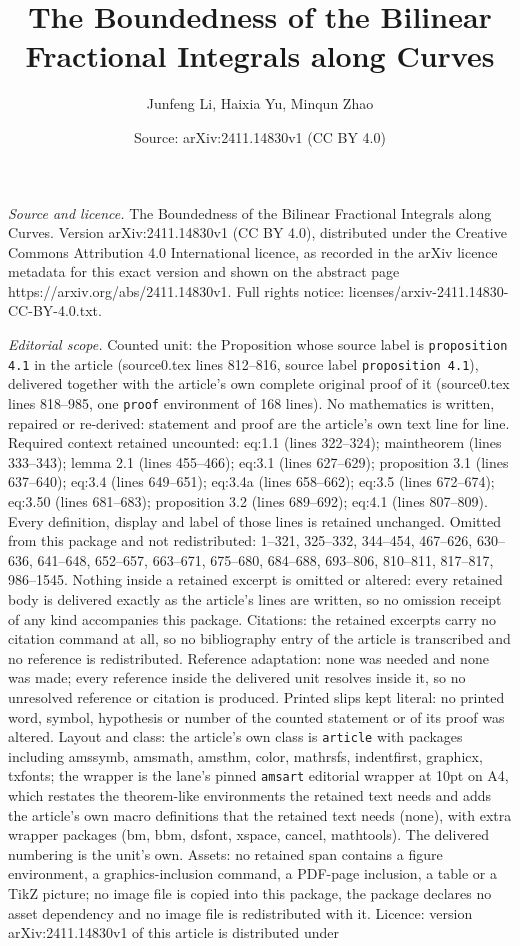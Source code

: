 \documentclass[10pt,a4paper]{amsart}
\title[The Boundedness of the Bilinear Fractional Integrals along C]{The Boundedness of the Bilinear Fractional Integrals along Curves}
\author{Junfeng Li, Haixia Yu, Minqun Zhao}
\date{Source: arXiv:2411.14830v1 (CC BY 4.0)}
\begin{document}
\maketitle

\noindent\emph{Source and licence.} The Boundedness of the Bilinear Fractional Integrals along Curves. Version arXiv:2411.14830v1 (CC BY 4.0), distributed under the Creative Commons Attribution 4.0 International licence, as recorded in the arXiv licence metadata for this exact version and shown on the abstract page https://arxiv.org/abs/2411.14830v1. Full rights notice: licenses/arxiv-2411.14830-CC-BY-4.0.txt.\par\smallskip

\noindent\textit{Editorial scope.} Counted unit: the Proposition whose source label is \texttt{proposition 4.1} in the article (source0.tex lines 812--816, source label \texttt{proposition 4.1}), delivered together with the article's own complete original proof of it (source0.tex lines 818--985, one \texttt{proof} environment of 168 lines). No mathematics is written, repaired or re-derived: statement and proof are the article's own text line for line. Required context retained uncounted: eq:1.1 (lines 322--324); maintheorem (lines 333--343); lemma 2.1 (lines 455--466); eq:3.1 (lines 627--629); proposition 3.1 (lines 637--640); eq:3.4 (lines 649--651); eq:3.4a (lines 658--662); eq:3.5 (lines 672--674); eq:3.50 (lines 681--683); proposition 3.2 (lines 689--692); eq:4.1 (lines 807--809). Every definition, display and label of those lines is retained unchanged. Omitted from this package and not redistributed: 1--321, 325--332, 344--454, 467--626, 630--636, 641--648, 652--657, 663--671, 675--680, 684--688, 693--806, 810--811, 817--817, 986--1545. Nothing inside a retained excerpt is omitted or altered: every retained body is delivered exactly as the article's lines are written, so no omission receipt of any kind accompanies this package. Citations: the retained excerpts carry no citation command at all, so no bibliography entry of the article is transcribed and no reference is redistributed. Reference adaptation: none was needed and none was made; every reference inside the delivered unit resolves inside it, so no unresolved reference or citation is produced. Printed slips kept literal: no printed word, symbol, hypothesis or number of the counted statement or of its proof was altered. Layout and class: the article's own class is \texttt{article} with packages including amssymb, amsmath, amsthm, color, mathrsfs, indentfirst, graphicx, txfonts; the wrapper is the lane's pinned \texttt{amsart} editorial wrapper at 10pt on A4, which restates the theorem-like environments the retained text needs and adds the article's own macro definitions that the retained text needs (none), with extra wrapper packages (bm, bbm, dsfont, xspace, cancel, mathtools). The delivered numbering is the unit's own. Assets: no retained span contains a figure environment, a graphics-inclusion command, a PDF-page inclusion, a table or a TikZ picture; no image file is copied into this package, the package declares no asset dependency and no image file is redistributed with it. Licence: version arXiv:2411.14830v1 of this article is distributed under 
\end{document}
